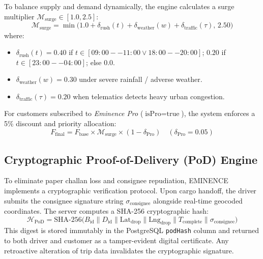 \documentclass[conference]{IEEEtran}
\begin{document}
To balance supply and demand dynamically, the engine calculates a surge multiplier $\mathcal{M}_{\text{surge}} \in [1.0, 2.5]$:
\begin{equation}
    \mathcal{M}_{\text{surge}} = \min\Big(1.0 + \delta_{\text{rush}}(t) + \delta_{\text{weather}}(w) + \delta_{\text{traffic}}(\tau), \, 2.50\Big)
\end{equation}
where:
\begin{itemize}
    \item $\delta_{\text{rush}}(t) = 0.40$ if $t \in [09:00--11:00 \lor 18:00--20:00]$; $0.20$ if $t \in [23:00--04:00]$; else $0.0$.
    \item $\delta_{\text{weather}}(w) = 0.30$ under severe rainfall / adverse weather.
    \item $\delta_{\text{traffic}}(\tau) = 0.20$ when telematics detects heavy urban congestion.
\end{itemize}

For customers subscribed to \textit{Eminence Pro} ($\text{isPro} = \text{true}$), the system enforces a 5\% discount and priority allocation:
\begin{equation}
    F_{\text{final}} = F_{\text{base}} \times \mathcal{M}_{\text{surge}} \times (1 - \delta_{\text{Pro}}) \quad (\delta_{\text{Pro}} = 0.05)
\end{equation}

\subsection{Cryptographic Proof-of-Delivery (PoD) Engine}
To eliminate paper challan loss and consignee repudiation, EMINENCE implements a cryptographic verification protocol. Upon cargo handoff, the driver submits the consignee signature string $\sigma_{\text{consignee}}$ alongside real-time geocoded coordinates. The server computes a SHA-256 cryptographic hash:
\begin{equation}
    \mathcal{H}_{\text{PoD}} = \text{SHA-256}\Big(B_{\text{id}} \parallel D_{\text{id}} \parallel \text{Lat}_{\text{drop}} \parallel \text{Lng}_{\text{drop}} \parallel T_{\text{complete}} \parallel \sigma_{\text{consignee}}\Big)
\end{equation}
This digest is stored immutably in the PostgreSQL \texttt{podHash} column and returned to both driver and customer as a tamper-evident digital certificate. Any retroactive alteration of trip data invalidates the cryptographic signature.
\end{document}
